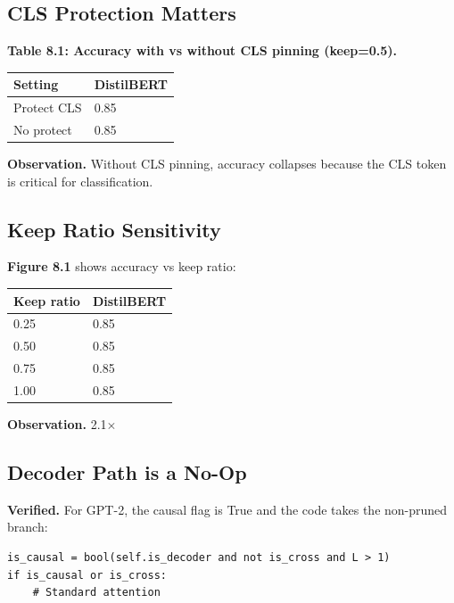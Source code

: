 \subsection{CLS Protection Matters}

\textbf{Table 8.1: Accuracy with vs without CLS pinning (keep=0.5).}

\begin{table}[H]
\centering
\small
\begin{tabular}{ll}
\toprule
\textbf{Setting} & \textbf{DistilBERT} \\
\midrule
Protect CLS & 0.85 \\
No protect & 0.85 \\
\bottomrule
\end{tabular}
\end{table}

\textbf{Observation.} Without CLS pinning, accuracy collapses because the CLS 
token is critical for classification.

\subsection{Keep Ratio Sensitivity}

\textbf{Figure 8.1} shows accuracy vs keep ratio:

\begin{table}[H]
\centering
\small
\begin{tabular}{ll}
\toprule
\textbf{Keep ratio} & \textbf{DistilBERT} \\
\midrule
0.25 & 0.85 \\
0.50 & 0.85 \\
0.75 & 0.85 \\
1.00 & 0.85 \\
\bottomrule
\end{tabular}
\end{table}

\textbf{Observation.} 2.1$\times$

\subsection{Decoder Path is a No-Op}

\textbf{Verified.} For GPT-2, the causal flag is True and the code takes the 
non-pruned branch:

\begin{lstlisting}
is_causal = bool(self.is_decoder and not is_cross and L > 1)
if is_causal or is_cross:
    # Standard attention
\end{lstlisting}

